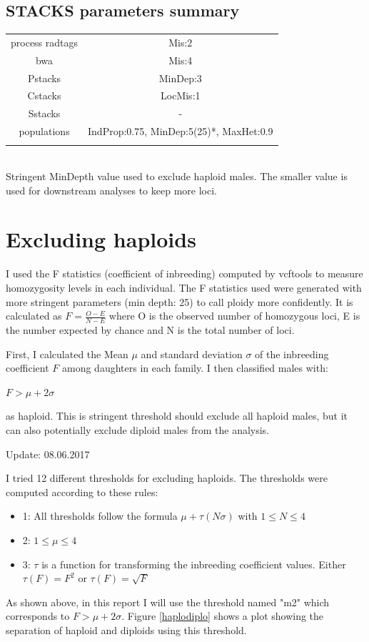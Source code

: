 \documentclass[10pt,a4paper]{report}
\begin{document}
\section{STACKS parameters summary}
\begin{table}[h!]
\begin{tabular}{c|c}
process radtags & Mis:2\\
bwa & Mis:4\\
Pstacks & MinDep:3\\
Cstacks & LocMis:1\\
Sstacks & -\\
populations & IndProp:0.75, MinDep:5(25)*, MaxHet:0.9\\
\vspace{5px}
\end{tabular}
\\
 \footnotesize * Stringent MinDepth value used to exclude haploid males. The smaller value is used for downstream analyses to keep more loci.
\end{table}

\FloatBarrier

\chapter{Excluding haploids}

I used the F statistics (coefficient of inbreeding) computed by vcftools to measure homozygosity levels in each individual. The F statistics used were generated with more stringent parameters (min depth: 25) to call ploidy more confidently. It is calculated as $F = \frac{O-E}{N-E}$ where O is the observed number of homozygous loci, E is the number expected by chance and N is the total number of loci.

First, I calculated the Mean $\mu$ and standard deviation $\sigma$ of the inbreeding coefficient $F$ among daughters in each family. I then classified males with:
\\
\begin{center}
 $F > \mu + 2\sigma $  \\
\end{center}

 as haploid. This is stringent threshold should exclude all haploid males, but it can also potentially exclude diploid males from the analysis.

Update: 08.06.2017

I tried 12 different thresholds for excluding haploids. The thresholds were computed according to these rules:
\begin{itemize}
\item 1: All thresholds follow the formula $\mu + \tau(N\sigma)$ with $1 \leq N \leq 4$
\item 2:  $1 \leq \mu \leq 4$
\item 3: $\tau$ is a function for transforming the inbreeding coefficient values. Either $\tau(F) = F^2$ or $\tau(F) = \sqrt{F}$
\end{itemize}
As shown above, in this report I will use the threshold named "m2" which corresponds to  $F > \mu + 2\sigma $.
Figure \ref{haplodiplo} shows a plot showing the separation of haploid and diploids using this threshold.
\end{document}
